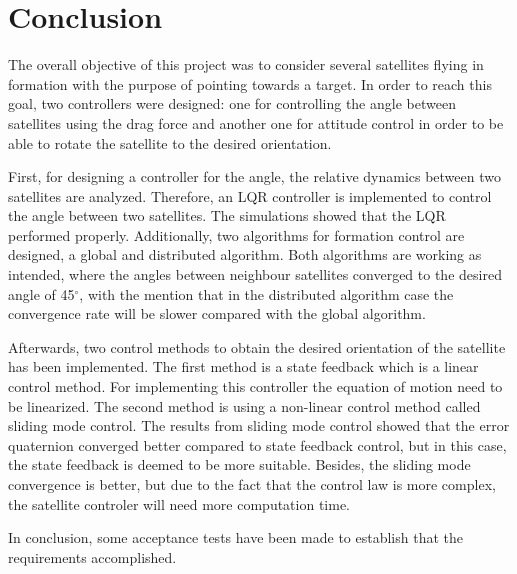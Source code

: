 \chapter{Conclusion}
The overall objective of this project was to consider several satellites flying in formation with the purpose of pointing towards a target. In order to reach this goal, two controllers were designed: one for controlling the angle between satellites using the drag force and another one for attitude control in order to be able to rotate the satellite to the desired orientation.

First, for designing a controller for the angle, the relative dynamics between two satellites are analyzed. Therefore, an LQR controller is implemented to control the angle between two satellites. The simulations showed that the LQR performed properly. Additionally, two algorithms for formation control are designed, a global and distributed algorithm. Both algorithms are working as intended, where the angles between neighbour satellites converged to the desired angle of 45$^{\circ}$, with the mention that in the distributed algorithm case the convergence rate will be slower compared with the global algorithm.

Afterwards, two control methods to obtain the desired orientation of the satellite has been implemented. The first method is a state feedback which is a linear control method. For implementing this controller the equation of motion need to be linearized. The second method is using a non-linear control method called sliding mode control. The results from sliding mode control showed that the error quaternion converged better compared to state feedback control, but in this case, the state feedback is deemed to be more suitable. Besides, the sliding mode convergence is better, but due to the fact that the control law is more complex, the satellite controler will need more computation time. 

In conclusion, some acceptance tests have been made to establish that the requirements accomplished. 